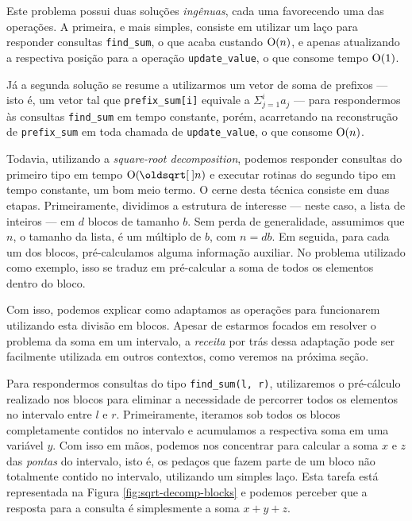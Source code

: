 Este problema possui duas soluções \emph{ingênuas}, cada uma favorecendo uma das operações. A primeira, e mais simples, consiste em utilizar um laço para responder consultas \texttt{find\_sum}, o que acaba custando $\mathrm{O}(n)$, e apenas atualizando a respectiva posição para a operação \texttt{update\_value}, o que consome tempo $\mathrm{O}(1)$.

Já a segunda solução se resume a utilizarmos um vetor de soma de prefixos --- isto é, um vetor tal que \texttt{prefix\_sum[i]} equivale a $\Sigma_{j=1}^{i} a_j$ --- para respondermos às consultas \texttt{find\_sum} em tempo constante, porém, acarretando na reconstrução de \texttt{prefix\_sum} em toda chamada de \texttt{update\_value}, o que consome $\mathrm{O}(n)$.

Todavia, utilizando a \emph{square-root decomposition}, podemos responder consultas do primeiro tipo em tempo $\Oh(\sqrt{n})$ e executar rotinas do segundo tipo em tempo constante, um bom meio termo. O cerne desta técnica consiste em duas etapas. Primeiramente, dividimos a estrutura de interesse --- neste caso, a lista de inteiros --- em $d$ blocos de tamanho $b$. Sem perda de generalidade, assumimos que $n$, o tamanho da lista, é um múltiplo de $b$, com $n = db$. Em seguida, para cada um dos blocos, pré-calculamos alguma informação auxiliar. No problema utilizado como exemplo, isso se traduz em pré-calcular a soma de todos os elementos dentro do bloco.

Com isso, podemos explicar como adaptamos as operações para funcionarem utilizando esta divisão em blocos. Apesar de estarmos focados em resolver o problema da soma em um intervalo, a \emph{receita} por trás dessa adaptação pode ser facilmente utilizada em outros contextos, como veremos na próxima seção.

Para respondermos consultas do tipo \texttt{find\_sum(l, r)}, utilizaremos o pré-cálculo realizado nos blocos para eliminar a necessidade de percorrer todos os elementos no intervalo entre $l$ e $r$. Primeiramente, iteramos sob todos os blocos completamente contidos no intervalo e acumulamos a respectiva soma em uma variável $y$. Com isso em mãos, podemos nos concentrar para calcular a soma $x$ e $z$ das \emph{pontas} do intervalo, isto é, os pedaços que fazem parte de um bloco não totalmente contido no intervalo, utilizando um simples laço. Esta tarefa está representada na Figura \ref{fig:sqrt-decomp-blocks} e podemos perceber que a resposta para a consulta é simplesmente a soma $x + y + z$.

